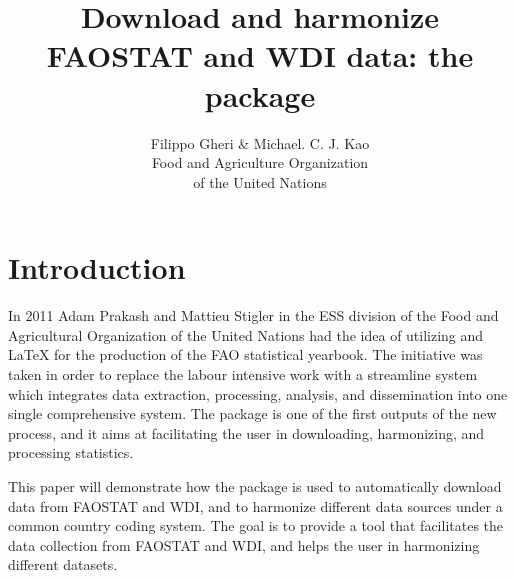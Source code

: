 \documentclass[nojss]{jss}\usepackage[]{graphicx}\usepackage[]{color}
\author{Filippo Gheri \& Michael. C. J. Kao\\ Food and Agriculture Organization \\of
  the United Nations}
\title{Download and harmonize FAOSTAT and WDI data: the \pkg{FAOSTAT} package}
\begin{document}
\section{Introduction}
In 2011 Adam Prakash and Mattieu Stigler in the ESS division of the Food and Agricultural Organization of the United Nations had the idea of utilizing  and \LaTeX{} for the production of the FAO statistical yearbook. The initiative was taken in order to replace the labour intensive work with a streamline system which integrates data extraction, processing, analysis, and dissemination into one single comprehensive system. The  package is one of the first outputs of the new process, and it aims at facilitating the user in downloading, harmonizing, and processing statistics.

This paper will demonstrate how the  package is used to automatically download data from FAOSTAT and WDI, and to harmonize different data sources under a common country coding system. The goal is to provide a tool that facilitates the data collection from FAOSTAT and WDI, and helps the user in harmonizing different datasets.

\end{document}
